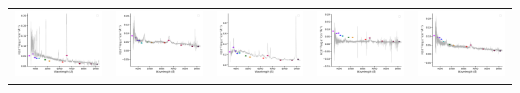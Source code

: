 \begin{center}
\begin{longtable}{l l l l l }
    \includegraphics[width=0.19\linewidth, clip]{Figs/Figs-sdss/spec-6781-56599-0575-STRIPE82-0056-038512.pdf} & \includegraphics[width=0.19\linewidth, clip]{Figs/Figs-sdss/spec-6782-56572-0334-STRIPE82-0059-014841.pdf} & \includegraphics[width=0.19\linewidth, clip]{Figs/Figs-sdss/spec-7820-56984-0072-STRIPE82-0065-043212.pdf} & \includegraphics[width=0.19\linewidth, clip]{Figs/Figs-sdss/spec-7822-57041-0034-STRIPE82-0061-046539.pdf} & \includegraphics[width=0.19\linewidth, clip]{Figs/Figs-sdss/spec-7856-57260-0204-STRIPE82-0018-064634.pdf} \\

\end{longtable}
\end{center}
